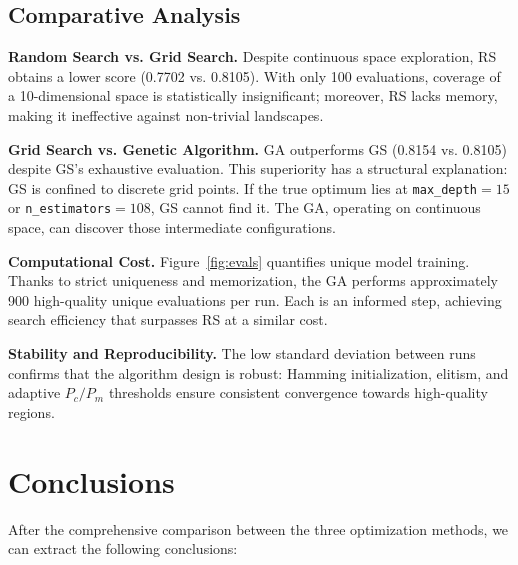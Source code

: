 \documentclass[12pt, a4paper]{article}
\begin{document}
\subsection{Comparative Analysis}

\textbf{Random Search vs. Grid Search.} Despite continuous space exploration, RS
obtains a lower score (0.7702 vs. 0.8105). With only 100 evaluations, coverage of
a 10-dimensional space is statistically insignificant; moreover, RS lacks memory,
making it ineffective against non-trivial landscapes.

\textbf{Grid Search vs. Genetic Algorithm.} GA outperforms GS (0.8154 vs. 0.8105)
despite GS's exhaustive evaluation. This superiority has a structural explanation:
GS is confined to discrete grid points. If the true optimum lies at
\texttt{max\_depth}$=15$ or \texttt{n\_estimators}$=108$, GS cannot find it.
The GA, operating on continuous space, can discover those intermediate configurations.

\textbf{Computational Cost.} Figure~\ref{fig:evals} quantifies unique model training.
Thanks to strict uniqueness and memorization, the GA performs approximately 900 high-quality
unique evaluations per run. Each is an informed step, achieving search efficiency
that surpasses RS at a similar cost.

\textbf{Stability and Reproducibility.} The low standard deviation between runs
confirms that the algorithm design is robust: Hamming initialization, elitism, and
adaptive $P_c/P_m$ thresholds ensure consistent convergence towards high-quality regions.

\section{Conclusions}

After the comprehensive comparison between the three optimization methods, we can
extract the following conclusions:
\end{document}
